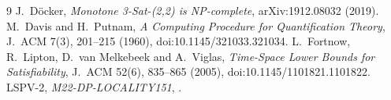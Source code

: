 \documentclass[11pt]{article}
\begin{document}
\begin{thebibliography}{9}
 J.~D\"ocker,
\emph{Monotone 3-Sat-(2,2) is NP-complete},
arXiv:1912.08032 (2019).
 M.~Davis and H.~Putnam,
\emph{A Computing Procedure for Quantification Theory},
J.~ACM 7(3), 201--215 (1960),
doi:10.1145/321033.321034.
 L.~Fortnow, R.~Lipton,
D.~van Melkebeek and A.~Viglas,
\emph{Time-Space Lower Bounds for Satisfiability},
J.~ACM 52(6), 835--865 (2005),
doi:10.1145/1101821.1101822.
 LSPV-2,
\emph{M22-DP-LOCALITY151},
.
\end{thebibliography}
\end{document}

